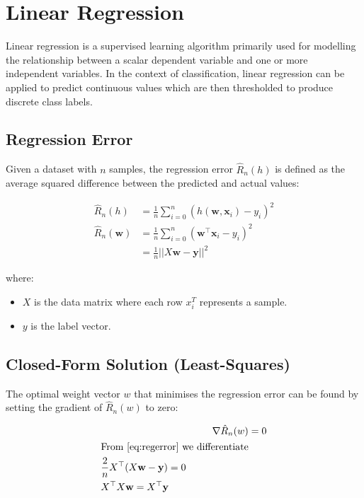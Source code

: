 \section{Linear Regression}
Linear regression is a supervised learning algorithm primarily used for modelling the relationship between a scalar dependent variable and one or more independent variables. In the context of classification, linear regression can be applied to predict continuous values which are then thresholded to produce discrete class labels.

\subsection{Regression Error}
Given a dataset with $n$ samples, the regression error $\hat{R}_n(h)$ is defined as the average squared difference between the predicted and actual values:

\begin{align}
    \hat{R}_n(h) &= \frac{1}{n} \sum_{i=0}^{n} (h(\textbf{w}, \textbf{x}_i) - y_i)^2 \\
    \hat{R}_n(\textbf{w}) &= \frac{1}{n} \sum_{i=0}^{n} (\textbf{w}^\top \textbf{x}_i - y_i)^2 \\ \label{eq:regerror}
    &= \frac{1}{n} ||X\textbf{w} - \textbf{y}||^2
\end{align}

where:
\begin{itemize}
    \item $X$ is the data matrix where each row $x_i^T$ represents a sample.
    \item $y$ is the label vector.
\end{itemize}

\subsection{Closed-Form Solution (Least-Squares)}
The optimal weight vector $w$ that minimises the regression error can be found by setting the gradient of $\hat{R}_n(w)$ to zero:

\begin{align*}
    \nabla \hat{R}_n(w) &= 0 \\
    \begin{aligned}
        &\text{From \eqref{eq:regerror} we differentiate} \\
        &\frac{2}{n}X^\top(X\textbf{w} - \textbf{y}) = 0 \\
        &X^\top X\textbf{w} = X^\top \textbf{y}
    \end{aligned}
\end{align*}

